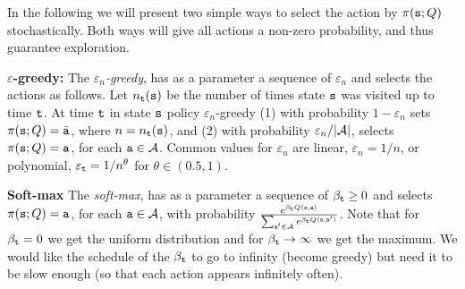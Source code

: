 In the following we will present two simple ways to select the
action by $\pi({\tt s};Q)$ stochastically. Both ways will give
all actions a non-zero probability, and thus guarantee exploration.

\textbf{$\varepsilon$-greedy: }The \emph{ $\varepsilon_n$-greedy}, has as a parameter a sequence of
$\varepsilon_n$ and selects the actions as follows. Let
$n_{\tt t}({\tt s})$ be the number of times state ${\tt s}$ was visited
up to time ${\tt t}$. At time ${\tt t}$ in state ${\tt s}$ policy
$\varepsilon_n$-greedy (1) with probability $1-\varepsilon_n$ sets
$\pi({\tt s};Q)=\bar{{\tt a}}$, where $n=n_{\tt t}({\tt s})$, and
(2) with probability $\varepsilon_n/|\mathcal{A}|$, selects
$\pi({\tt s};Q)={\tt a}$, for each ${\tt a} \in \mathcal{A}$. Common
values for $\varepsilon_n$ are linear, $\varepsilon_n=1/n$, or
polynomial, $\varepsilon_{\tt t}=1/n^\theta$ for $\theta\in(0.5,1)$.

\textbf{Soft-max} The {\em soft-max}, has as a parameter a sequence of
$\beta_{\tt t}\geq 0$ and selects $\pi({\tt s};Q)={\tt a}$, for
each ${\tt a} \in \mathcal{A}$, with probability $\frac{e^{\beta_{\tt t}
Q({\tt s},{\tt a})}}{\sum_{{\tt a}'\in \mathcal{A}}e^{\beta_{\tt t}
Q({\tt s},{\tt a}')}}$. Note that for $\beta_{\tt t}=0$ we get the
uniform distribution and for $\beta_{\tt t}\rightarrow \infty$ we get
the maximum. We would like the schedule of the $\beta_{\tt t}$ to go
to infinity (become greedy) but need it to be slow enough (so that
each action appears infinitely often).

